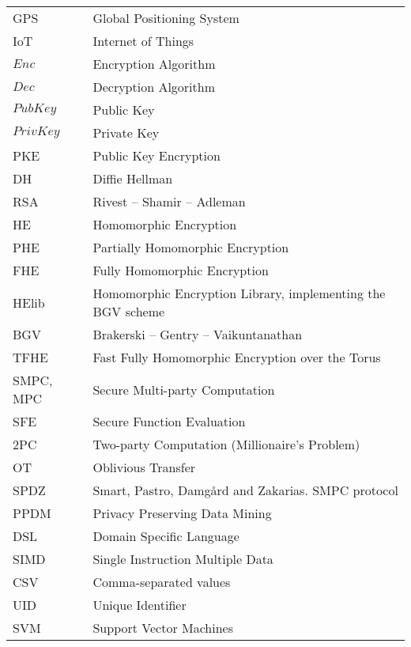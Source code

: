 \abbreviations
\begin{center}
	\renewcommand{\arraystretch}{1.5}
	\begin{longtable}{ l @{\qquad} l }
	\toprule
	GPS 			& Global Positioning System \\
	IoT				& Internet of Things \\
  $Enc$     & Encryption Algorithm \\
  $Dec$     & Decryption Algorithm \\
  $PubKey$  & Public Key \\
  $PrivKey$ & Private Key \\
  PKE       & Public Key Encryption \\
  DH        & Diffie Hellman \\
  RSA       & Rivest -- Shamir -- Adleman \\
  HE        & Homomorphic Encryption \\
  PHE       & Partially Homomorphic Encryption \\
  FHE       & Fully Homomorphic Encryption \\
  HElib     & Homomorphic Encryption Library, implementing the BGV scheme \\
  BGV       & Brakerski -- Gentry -- Vaikuntanathan \\
  TFHE      & Fast Fully Homomorphic Encryption over the Torus \\
  SMPC, MPC & Secure Multi-party Computation \\
  SFE       & Secure Function Evaluation \\
  2PC       & Two-party Computation (Millionaire's Problem) \\
  OT        & Oblivious Transfer \\
  SPDZ      & Smart, Pastro, Damg{\aa}rd and Zakarias. SMPC protocol \\
  PPDM      & Privacy Preserving Data Mining \\
  DSL       & Domain Specific Language \\
  SIMD      & Single Instruction Multiple Data \\
	CSV 			& Comma-separated values\\
	UID 			& Unique Identifier \\
	SVM 			& Support Vector Machines \\

	\bottomrule
	\end{longtable}
\end{center}
